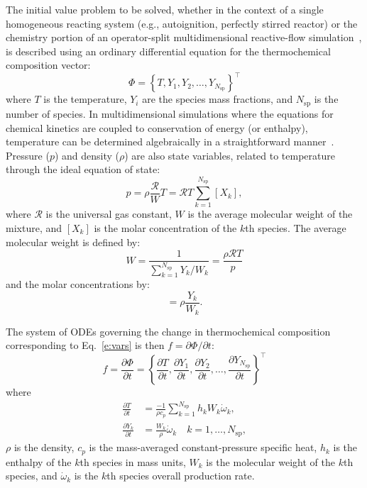 \documentclass[preprint,12pt]{elsarticle}
\newcommand{ \ddt } [1] { \frac{ \partial #1 }{ \partial t } }
\begin{document}
The initial value problem to be solved, whether in the context of a single homogeneous reacting system (e.g., autoignition, perfectly stirred reactor) or the chemistry portion of an operator-split multidimensional reactive-flow simulation~\cite{Oran:2001aa}, is described using an ordinary differential equation for the thermochemical composition vector:
\begin{equation}
\label{e:vars}
\Phi = \left \lbrace T, Y_1, Y_2, \dotsc, Y_{N_{\text{sp}}} \right \rbrace^{\intercal}
\end{equation}
where $T$ is the temperature, $Y_i$ are the species mass fractions, and $N_{\text{sp}}$ is the number of species. 
In multidimensional simulations where the equations for chemical kinetics are coupled to conservation of energy (or enthalpy), temperature can be determined algebraically in a straightforward manner~\cite{Oran:2001aa}.
Pressure ($p$) and density ($\rho$) are also state variables, related to temperature through the ideal equation of state:
\begin{equation}
\label{e:state}
p = \rho \frac{\mathcal{R}}{W} T = \mathcal{R} T \sum_{k=1}^{N_{\text{sp}}} [X_k] ,
\end{equation}
where $\mathcal{R}$ is the universal gas constant, $W$ is the average molecular weight of the mixture, and $[X_k]$ is the molar concentration of the $k$th species.
The average molecular weight is defined by:
\begin{equation}
W = \frac{1}{\sum_{k=1}^{N_{\text{sp}}} Y_k / W_k} = \frac{\rho \mathcal{R} T}{p}
\end{equation}
and the molar concentrations by:
\begin{equation}
[X_k] = \rho \frac{Y_k}{W_k} .
\end{equation}

The system of ODEs governing the change in thermochemical composition corresponding to Eq.~\eqref{e:vars} is then $ f = \partial \Phi/ \partial t$:
\begin{equation}
f = \ddt{\Phi} = \left \lbrace \ddt{T}, \ddt{Y_1}, \ddt{Y_2}, \dotsc, \ddt{Y_{N_{\text{sp}}}} \right \rbrace^{\intercal}
\label{e:ode}
\end{equation}
where
\begin{align}
\ddt{T} &= \frac{-1}{\rho c_p} \sum_{k=1}^{N_{\text{sp}}} h_k W_k \dot{\omega}_k , \\
\ddt{Y_k} &= \frac{W_k}{\rho} \dot{\omega}_k \quad k = 1, \dotsc, N_{\text{sp}}, 
\end{align}
$\rho$ is the density, $c_p$ is the mass-averaged constant-pressure specific heat, $h_k$ is the enthalpy of the $k$th species in mass units, $W_k$ is the molecular weight of the $k$th species, and $\dot{\omega}_k$ is the $k$th species overall production rate.
\end{document}
